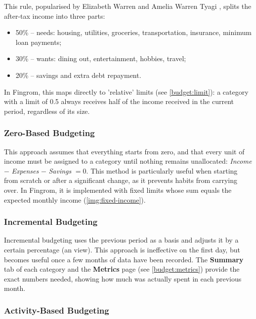 This rule, popularised by Elizabeth Warren and Amelia Warren Tyagi \cite{Warr05}, splits the
after-tax income into three parts:

\begin{itemize}
  \item 50\% -- needs: housing, utilities, groceries, transportation, insurance, minimum loan
  payments;
  \item 30\% -- wants: dining out, entertainment, hobbies, travel;
  \item 20\% -- savings and extra debt repayment.
\end{itemize}

\noindent In Fingrom, this maps directly to 'relative' limits (see \cref{budget:limit}): a
category with a limit of 0.5 always receives half of the income received in the current
period, regardless of its size.


\subsubsection{Zero-Based Budgeting}

This approach assumes that everything starts from zero, and that every unit of income must be
assigned to a category until nothing remains unallocated: \emph{Income} $-$ \emph{Expenses}
$-$ \emph{Savings} $= 0$. This method is particularly useful when starting from scratch or
after a significant change, as it prevents habits from carrying over. In Fingrom, it is
implemented with fixed limits whose sum equals the expected monthly income
(\cref{img:fixed-income}).



\subsubsection{Incremental Budgeting}

Incremental budgeting uses the previous period as a basis and adjusts it by a certain
percentage (an  view). This approach is ineffective on the first day, but
becomes useful once a few months of data have been recorded. The \textbf{Summary} tab of each
category and the \textbf{Metrics} page (see \cref{budget:metrics}) provide the exact numbers
needed, showing how much was actually spent in each previous month.


\subsubsection{Activity-Based Budgeting}

